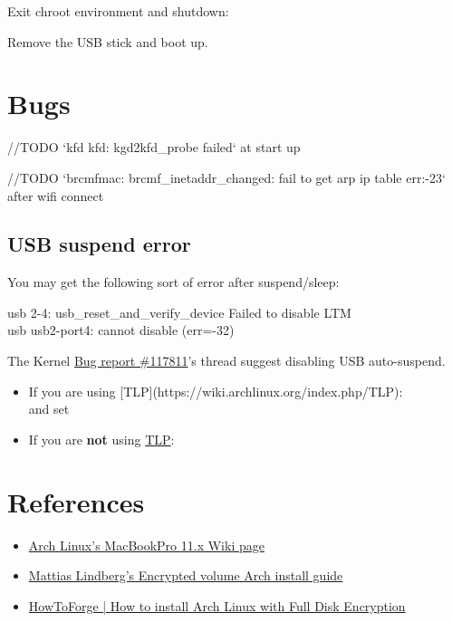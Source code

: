 Exit chroot environment and shutdown:


Remove the USB stick and boot up.

\section{Bugs}

//TODO `kfd kfd: kgd2kfd\_probe failed` at start up

//TODO `brcmfmac: brcmf\_inetaddr\_changed: fail to get arp ip table err:-23` after wifi connect



\subsection{USB suspend error}

You may get the following sort of error after suspend/sleep:

\begin{codeblock}
    usb 2-4: usb\_reset\_and\_verify\_device Failed to disable LTM\\
    usb usb2-port4: cannot disable (err=-32)
\end{codeblock}

The Kernel \href{https://bugzilla.kernel.org/show_bug.cgi?id=117811}{Bug report \#117811}'s thread suggest disabling USB auto-suspend.

\begin{itemize}[noitemsep,topsep=0pt,leftmargin=*]
    \item If you are using [TLP](https://wiki.archlinux.org/index.php/TLP):\\
         and set 
    \item If you are \textbf{not} using \href{https://wiki.archlinux.org/index.php/TLP}{TLP}:\\
\end{itemize}



\clearpage
\section{References}

\begin{itemize}
	\item \href{https://wiki.archlinux.org/index.php/MacBookPro11,x#Using_the_MacBook.27s_native_EFI_bootloader_.28recommended.29}{Arch Linux's MacBookPro 11.x Wiki page}
	\item \href{https://gist.github.com/mattiaslundberg/8620837}{Mattias Lindberg's Encrypted volume Arch install guide}
	\item \href{https://www.howtoforge.com/tutorial/how-to-install-arch-linux-with-full-disk-encryption/}{HowToForge | How to install Arch Linux with Full Disk Encryption}
\end{itemize}


